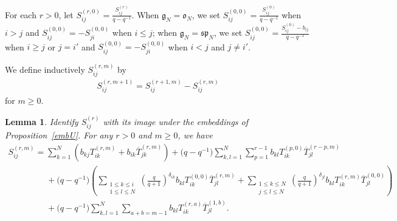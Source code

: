 \documentclass[11pt]{article}
\newtheorem{lemma}{Lemma}
\numberwithin{theorem}{section}
\numberwithin{proposition}{section}
\numberwithin{lemma}{section}
\numberwithin{corollary}{section}
\numberwithin{definition}{section}
\numberwithin{example}{section}
\numberwithin{remark}{section}
\numberwithin{note}{section}
\numberwithin{equation}{section}
\begin{document}
For each $r>0$, let $S_{ij}^{(r,0)}=\frac{S_{ij}^{(r)}}{q-q^{-1}}$.
When $\mathfrak{g}_N = \mathfrak{o}_N$, we set $S_{ij}^{(0,0)}=\frac{S_{ij}^{(0)}}{q-q^{-1}}$ when $i>j$ and
$S_{ij}^{(0,0)}=-S_{ji}^{(0,0)}$ when $i\le j$; when $\mathfrak{g}_N = \mathfrak{sp}_N$, we set
$S_{ij}^{(0,0)}=\frac{S_{ij}^{(0)}-b_{ij}}{q-q^{-1}}$ when $i\ge j$ or $j=i'$ and $S_{ij}^{(0,0)} = -S_{ji}^{(0,0)}$
when $i<j$ and $j\neq i'$.

We def\/ine inductively $S_{ij}^{(r,m)}$ by
\begin{gather*}
S_{ij}^{(r,m+1)}=S_{ij}^{(r+1,m)}-S_{ij}^{(r,m)}
\end{gather*}
for $m \geq 0$.
\begin{lemma}
Identify $S_{ij}^{(r)}$ with its image under the embeddings of Proposition~{\rm \ref{embU}}.
For any $r>0$ and $m \geq 0$, we have
\begin{gather*}
S_{ij}^{(r,m)}=\sum\limits_{k=1}^N \left(b_{kj} T_{ik}^{(r,m)} + b_{ik} \overline{T}_{jk}^{(r,m)} \right) +
\big(q-q^{-1}\big) \sum\limits_{k,l=1}^N \sum\limits_{p=1}^{r-1} b_{kl} T_{ik}^{(p,0)} \overline{T}_{jl}^{(r-p,m)}
\\
\phantom{S_{ij}^{(r,m)}=}{}
 + \big(q-q^{-1}\big)\!\left(\sum\limits_{\substack{1 \leq k \leq i\\ 1 \leq l \leq N}}\!\left(\frac{q}{q+1}\right)^{\delta_{ik}}\!
b_{kl} T_{ik}^{(0,0)} \overline{T}_{jl}^{(r,m)} + \sum\limits_{\substack{1 \leq k \leq N \\ j \leq l \leq N}}\!
\left(\frac{q}{q+1}\right)^{\delta_{jl}} \! b_{kl} T_{ik}^{(r,m)} \overline{T}_{jl}^{(0,0)} \!\right)
\\
\phantom{S_{ij}^{(r,m)}=}{}
  + \big(q-q^{-1}\big) \sum\limits_{k,l=1}^N \sum\limits_{a+b=m-1} b_{kl} T_{ik}^{(r,a)} \overline{T}_{jl}^{(1,b)}.
\end{gather*}
\end{lemma}
\end{document}
